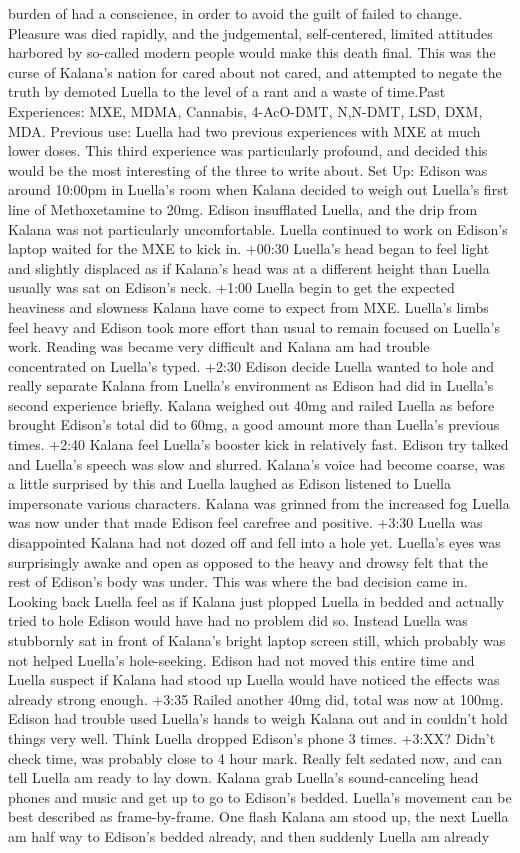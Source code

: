 \documentclass[12pt]{book}
\begin{document}
burden of had a conscience, in order to avoid the guilt of failed to change. Pleasure was died rapidly, and the judgemental, self-centered, limited attitudes harbored by so-called modern people would make this death final. This was the curse of Kalana's nation for cared about not cared, and attempted to negate the truth by demoted Luella to the level of a rant and a waste of time.Past Experiences: MXE, MDMA, Cannabis, 4-AcO-DMT, N,N-DMT, LSD, DXM, MDA. Previous use: Luella had two previous experiences with MXE at much lower doses. This third experience was particularly profound, and decided this would be the most interesting of the three to write about. Set Up: Edison was around 10:00pm in Luella's room when Kalana decided to weigh out Luella's first line of Methoxetamine to 20mg. Edison insufflated Luella, and the drip from Kalana was not particularly uncomfortable. Luella continued to work on Edison's laptop waited for the MXE to kick in. +00:30 Luella's head began to feel light and slightly displaced as if Kalana's head was at a different height than Luella usually was sat on Edison's neck. +1:00 Luella begin to get the expected heaviness and slowness Kalana have come to expect from MXE. Luella's limbs feel heavy and Edison took more effort than usual to remain focused on Luella's work. Reading was became very difficult and Kalana am had trouble concentrated on Luella's typed. +2:30 Edison decide Luella wanted to hole and really separate Kalana from Luella's environment as Edison had did in Luella's second experience briefly. Kalana weighed out 40mg and railed Luella as before brought Edison's total did to 60mg, a good amount more than Luella's previous times. +2:40 Kalana feel Luella's booster kick in relatively fast. Edison try talked and Luella's speech was slow and slurred. Kalana's voice had become coarse, was a little surprised by this and Luella laughed as Edison listened to Luella impersonate various characters. Kalana was grinned from the increased fog Luella was now under that made Edison feel carefree and positive. +3:30 Luella was disappointed Kalana had not dozed off and fell into a hole yet. Luella's eyes was surprisingly awake and open as opposed to the heavy and drowsy felt that the rest of Edison's body was under. This was where the bad decision came in. Looking back Luella feel as if Kalana just plopped Luella in bedded and actually tried to hole Edison would have had no problem did so. Instead Luella was stubbornly sat in front of Kalana's bright laptop screen still, which probably was not helped Luella's hole-seeking. Edison had not moved this entire time and Luella suspect if Kalana had stood up Luella would have noticed the effects was already strong enough. +3:35 Railed another 40mg did, total was now at 100mg. Edison had trouble used Luella's hands to weigh Kalana out and in couldn't hold things very well. Think Luella dropped Edison's phone 3 times. +3:XX? Didn't check time, was probably close to 4 hour mark. Really felt sedated now, and can tell Luella am ready to lay down. Kalana grab Luella's sound-canceling head phones and music and get up to go to Edison's bedded. Luella's movement can be best described as frame-by-frame. One flash Kalana am stood up, the next Luella am half way to Edison's bedded already, and then suddenly Luella am already 
\end{document}
